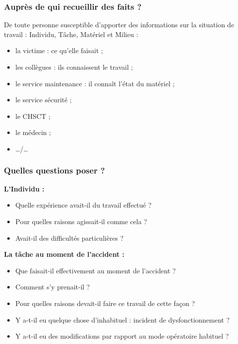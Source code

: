 \documentclass{beamer}
\begin{document}
\begin{frame}
\frametitle{Auprès de qui recueillir des faits ?}

De toute personne susceptible d’apporter des informations sur la situation de travail : Individu, Tâche, Matériel et Milieu :

\begin{itemize}
\item la victime : ce qu’elle faisait ;
\item les collègues : ils connaissent le travail ;
\item le service maintenance : il connaît l’état du matériel ;
\item le service sécurité ;
\item le CHSCT ;
\item le médecin ;
\item …/…
\end{itemize}
\end{frame}

\begin{frame}
\frametitle{Quelles questions poser ?}

\textbf{L'Individu :}
\begin{itemize}
\item Quelle expérience avait-il du travail effectué ?
\item Pour quelles raisons agissait-il comme cela ?
\item Avait-il des difficultés particulières ?
\end{itemize}

\textbf{La tâche au moment de l'accident :}
\begin{itemize}
\item Que faisait-il effectivement au moment de l’accident ?
\item Comment s’y prenait-il ?
\item Pour quelles raisons devait-il faire ce travail de cette façon ?
\item Y a-t-il eu quelque chose d’inhabituel : incident de dysfonctionnement ?
\item Y a-t-il eu des modifications par rapport au mode opératoire habituel ?
\end{itemize}
\end{frame}
\end{document}
